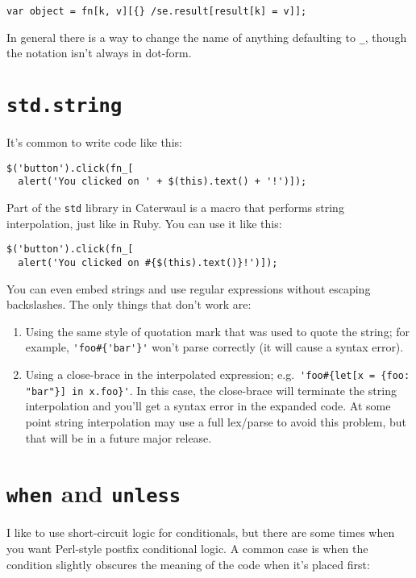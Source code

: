 \documentclass{report}
\begin{document}
\begin{verbatim}
var object = fn[k, v][{} /se.result[result[k] = v]];
\end{verbatim}

      In general there is a way to change the name of anything defaulting to \verb|_|, though the notation isn't always in dot-form.

\section{{\tt std.string}}\label{sec:the-std-library-std-string}
    It's common to write code like this:

\begin{verbatim}
$('button').click(fn_[
  alert('You clicked on ' + $(this).text() + '!')]);
\end{verbatim}

    Part of the {\tt std} library in Caterwaul is a macro that performs string interpolation, just like in Ruby. You can use it like this:

\begin{verbatim}
$('button').click(fn_[
  alert('You clicked on #{$(this).text()}!')]);
\end{verbatim}

    You can even embed strings and use regular expressions without escaping backslashes. The only things that don't work are:

\begin{enumerate}
\item{Using the same style of quotation mark that was used to quote the string; for example, \verb|'foo#{'bar'}'| won't parse correctly (it will cause a syntax error).}
\item{Using a close-brace in the interpolated expression; e.g.~\verb|'foo#{let[x = {foo: "bar"}] in x.foo}'|. In this case, the close-brace will terminate the string interpolation and}
  you'll get a syntax error in the expanded code. At some point string interpolation may use a full lex/parse to avoid this problem, but that will be in a future major release.
\end{enumerate}

\section{{\tt when} and {\tt unless}}\label{sec:the-std-library-when-and-unless}
    I like to use short-circuit logic for conditionals, but there are some times when you want Perl-style postfix conditional logic. A common case is when the condition slightly obscures the
    meaning of the code when it's placed first:
\end{document}
